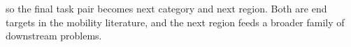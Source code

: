 so the final task pair becomes next category and next region. Both are end
targets in the mobility literature, and the next region feeds a broader family of
downstream problems.
